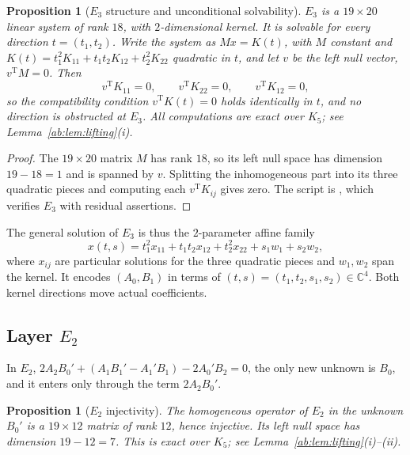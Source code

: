 \documentclass[a4paper,11pt]{article}
\newcommand{\filename}[1]{\texttt{\seqsplit{#1}}}
\theoremstyle{jsplain}
\newtheorem{proposition}[theorem]{Proposition}
\theoremstyle{jsdef}
\theoremstyle{jsrem}
\begin{document}
\begin{proposition}[$E_3$ structure and unconditional solvability]\label{ab:prop:e3}
$E_3$ is a $19\times20$ linear system of rank $18$, with $2$-dimensional kernel. It is solvable for every direction $t=(t_1,t_2)$. Write the system as $Mx=K(t)$, with $M$ constant and $K(t)=t_1^2K_{11}+t_1t_2K_{12}+t_2^2K_{22}$ quadratic in $t$, and let $v$ be the left null vector, $v^{\mathrm{T}}M=0$. Then
\begin{equation}
v^{\mathrm{T}} K_{11}=0,\qquad v^{\mathrm{T}} K_{22}=0,\qquad v^{\mathrm{T}} K_{12}=0,
\end{equation}
so the compatibility condition $v^{\mathrm T}K(t)=0$ holds identically in $t$, and no direction is obstructed at $E_3$. All computations are exact over $K_5$; see Lemma~\ref{ab:lem:lifting}(i).
\end{proposition}

\begin{proof}
The $19\times20$ matrix $M$ has rank $18$, so its left null space has dimension $19-18=1$ and is spanned by $v$. Splitting the inhomogeneous part into its three quadratic pieces and computing each $v^{\mathrm{T}}K_{ij}$ gives zero. The script is \filename{C5\_E2\_obstruction\_corrected.py}, which verifies $E_3$ with residual assertions.
\end{proof}

The general solution of $E_3$ is thus the $2$-parameter affine family
\begin{equation}
x(t,s)=t_1^2x_{11}+t_1t_2x_{12}+t_2^2x_{22}+s_1w_1+s_2w_2,
\end{equation}
where $x_{ij}$ are particular solutions for the three quadratic pieces and $w_1,w_2$ span the kernel. It encodes $(A_0,B_1)$ in terms of $(t,s)=(t_1,t_2,s_1,s_2)\in\mathbb{C}^4$. Both kernel directions move actual coefficients.

\subsection{\texorpdfstring{Layer $E_2$}{Layer E2}}

In $E_2$, $2A_2B_0'+(A_1B_1'-A_1'B_1)-2A_0'B_2=0$, the only new unknown is $B_0$, and it enters only through the term $2A_2B_0'$.

\begin{proposition}[$E_2$ injectivity]\label{ab:prop:e2}
The homogeneous operator of $E_2$ in the unknown $B_0'$ is a $19\times12$ matrix of rank $12$, hence injective. Its left null space has dimension $19-12=7$. This is exact over $K_5$; see Lemma~\ref{ab:lem:lifting}(i)--(ii).
\end{proposition}
\end{document}
